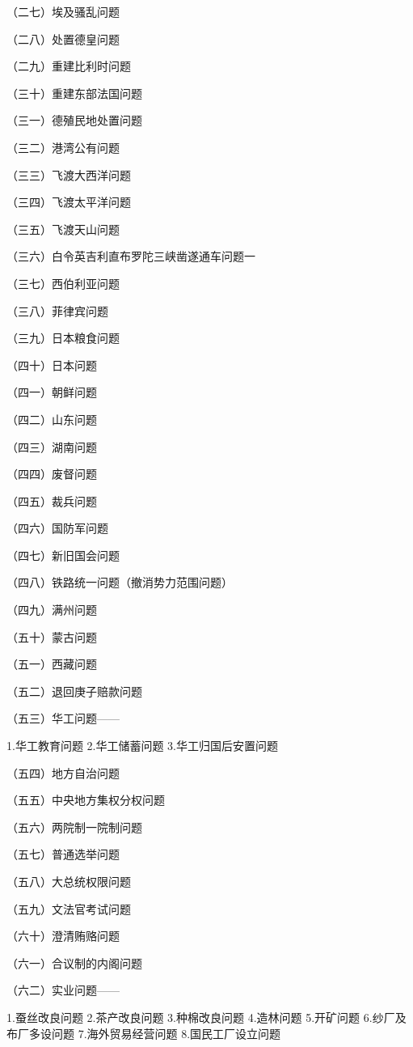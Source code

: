 （二七）埃及骚乱问题

（二八）处置德皇问题

（二九）重建比利时问题

（三十）重建东部法国问题

（三一）德殖民地处置问题

（三二）港湾公有问题

（三三）飞渡大西洋问题

（三四）飞渡太平洋问题

（三五）飞渡天山问题

（三六）白令英吉利直布罗陀三峡凿遂通车问题一

（三七）西伯利亚问题

（三八）菲律宾问题

（三九）日本粮食问题

（四十）日本问题

（四一）朝鲜问题

（四二）山东问题

（四三）湖南问题

（四四）废督问题

（四五）裁兵问题

（四六）国防军问题

（四七）新旧国会问题

（四八）铁路统一问题（撤消势力范围问题）

（四九）满州问题

（五十）蒙古问题

（五一）西藏问题

（五二）退回庚子赔款问题

（五三）华工问题——

1.华工教育问题\hspace{1em}
2.华工储蓄问题\hspace{1em}
3.华工归国后安置问题

（五四）地方自治问题

（五五）中央地方集权分权问题

（五六）两院制一院制问题

（五七）普通选举问题

（五八）大总统权限问题

（五九）文法官考试问题

（六十）澄清贿赂问题

（六一）合议制的内阁问题

（六二）实业问题——

1.蚕丝改良问题
2.茶产改良问题
3.种棉改良问题
4.造林问题
5.开矿问题
6.纱厂及布厂多设问题
7.海外贸易经营问题
8.国民工厂设立问题

